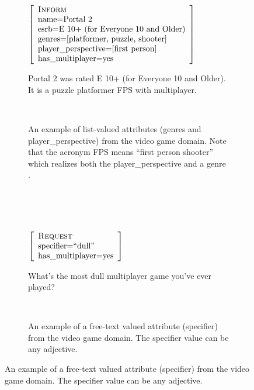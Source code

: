 \begin{figure}
 \begin{subfigure}{\textwidth}
    \begin{minipage}{0.5\textwidth}
\center
$\left[\begin{array}{l} 
    \textsc{Inform} \\ 
    \textrm{name=Portal 2} \\
    \textrm{esrb=E 10+ (for Everyone 10 and Older)} \\
    \textrm{genres=[platformer, puzzle, shooter]} \\
    \textrm{player\_perspective=[first person]} \\
    \textrm{has\_multiplayer=yes}
\end{array}\right]$ 
\end{minipage}
    \begin{minipage}{0.5\textwidth}
        Portal 2 was rated E 10+ (for Everyone 10 and
        Older). It is a puzzle platformer FPS with
        multiplayer.
\end{minipage}

~\\

\caption{An example of list-valued attributes (genres and player\_perspective)
    from the video game domain. Note that the acronym FPS means ``first person
shooter'' which realizes both the
player\_perspective \attributevalue and a genre \attributevalue. }
\end{subfigure}  

~\\
~\\
~\\

\begin{subfigure}{\textwidth}
    \begin{minipage}{0.5\textwidth}
    \center
$\left[\begin{array}{l} 
    \textsc{Request} \\ 
    \textrm{specifier=``dull''} \\
    \textrm{has\_multiplayer=yes}
\end{array}\right]$ 
\end{minipage}\begin{minipage}{0.5\textwidth}
    What's the most dull multiplayer game you've ever played?
\end{minipage}

~\\

\caption{An example of a free-text valued attribute (specifier) from the 
video game domain. The specifier value can be any adjective.}
\end{subfigure}  


\end{figure}
